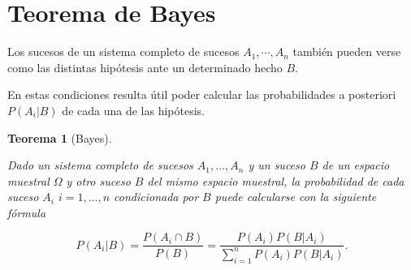 \documentclass[
  a4paper,
]{scrreport}
\theoremstyle{plain}
\newtheorem{theorem}{Teorema}[chapter]
\theoremstyle{definition}
\theoremstyle{definition}
\theoremstyle{remark}
\begin{document}
\section{Teorema de Bayes}\label{teorema-de-bayes}

Los sucesos de un sistema completo de sucesos \(A_1,\cdots,A_n\) también
pueden verse como las distintas hipótesis ante un determinado hecho
\(B\).

En estas condiciones resulta útil poder calcular las probabilidades a
posteriori \(P(A_i|B)\) de cada una de las hipótesis.

\begin{theorem}[Bayes]\protect\hypertarget{thm-bayes}{}\label{thm-bayes}

Dado un sistema completo de sucesos \(A_1,\ldots,A_n\) y un suceso \(B\)
de un espacio muestral \(\Omega\) y otro suceso \(B\) del mismo espacio
muestral, la probabilidad de cada suceso \(A_i\) \(i=1,\ldots,n\)
condicionada por \(B\) puede calcularse con la siguiente fórmula

\[P(A_i|B) = \frac{P(A_i\cap B)}{P(B)} = \frac{P(A_i)P(B|A_i)}{\sum_{i=1}^n P(A_i)P(B|A_i)}.\]

\end{theorem}
\end{document}
